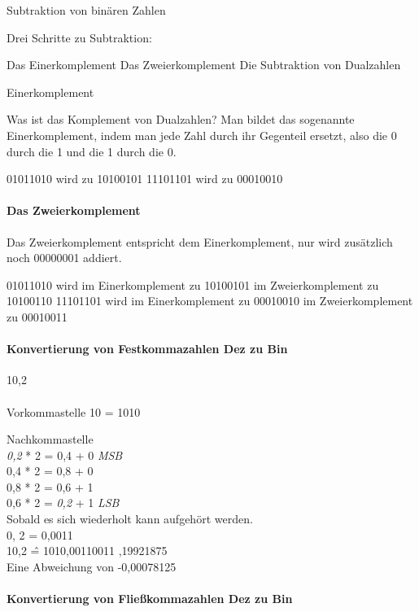 \documentclass[12pt,twoside,a4paper]{article}
\begin{document}
Subtraktion von binären Zahlen

Drei Schritte zu Subtraktion:

Das Einerkomplement
Das Zweierkomplement
Die Subtraktion von Dualzahlen

Einerkomplement

Was ist das Komplement von Dualzahlen? Man bildet das sogenannte Einerkomplement, indem man jede Zahl durch ihr Gegenteil ersetzt, also die 0 durch die 1 und die 1 durch die 0.

01011010 wird zu 10100101
11101101 wird zu 00010010

\paragraph{Das Zweierkomplement}

Das Zweierkomplement entspricht dem Einerkomplement, nur wird zusätzlich noch 00000001 addiert.

01011010 wird im Einerkomplement zu 10100101 im Zweierkomplement zu 10100110
11101101 wird im Einerkomplement zu 00010010 im Zweierkomplement zu 00010011

\paragraph{Konvertierung von Festkommazahlen Dez zu Bin}

10,2 \\
\\

Vorkommastelle
10 = 1010

Nachkommastelle\\
\emph{0,2} * 2 = 0,4 + 0 \emph{MSB} \\ 
0,4 * 2 = 0,8 + 0\\
0,8 * 2 = 0,6 + 1\\
0,6 * 2 = \emph{0,2} + 1 \emph{LSB} \\ 

Sobald es sich wiederholt kann aufgehört werden.\\
0, 2 = 0,0011\\
10,2 \^= 1010,00110011 ,19921875\\
\Longrightarrow Eine Abweichung von  -0,00078125\\

\paragraph{Konvertierung von Fließkommazahlen Dez zu Bin}
\end{document}
